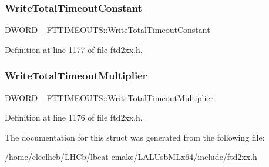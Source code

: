 \mbox{\label{struct__FTTIMEOUTS_ac36dfafaf9522e0b041080242538d196}} 
\subsubsection{\texorpdfstring{Write\+Total\+Timeout\+Constant}{WriteTotalTimeoutConstant}}
{\footnotesize\ttfamily \hyperlink{CatCaloProto40MHz_2inc_2WinTypes_8h_ad342ac907eb044443153a22f964bf0af}{D\+W\+O\+RD} \+\_\+\+F\+T\+T\+I\+M\+E\+O\+U\+T\+S\+::\+Write\+Total\+Timeout\+Constant}



Definition at line 1177 of file ftd2xx.\+h.

\mbox{\label{struct__FTTIMEOUTS_a1944986d4b6760a45db8ce1b58fa3688}} 
\subsubsection{\texorpdfstring{Write\+Total\+Timeout\+Multiplier}{WriteTotalTimeoutMultiplier}}
{\footnotesize\ttfamily \hyperlink{CatCaloProto40MHz_2inc_2WinTypes_8h_ad342ac907eb044443153a22f964bf0af}{D\+W\+O\+RD} \+\_\+\+F\+T\+T\+I\+M\+E\+O\+U\+T\+S\+::\+Write\+Total\+Timeout\+Multiplier}



Definition at line 1176 of file ftd2xx.\+h.



The documentation for this struct was generated from the following file\+:\begin{DoxyCompactItemize}
\item 
/home/eleclhcb/\+L\+H\+Cb/lbcat-\/cmake/\+L\+A\+L\+Usb\+M\+Lx64/include/\hyperlink{LALUsbMLx64_2include_2ftd2xx_8h}{ftd2xx.\+h}\end{DoxyCompactItemize}
